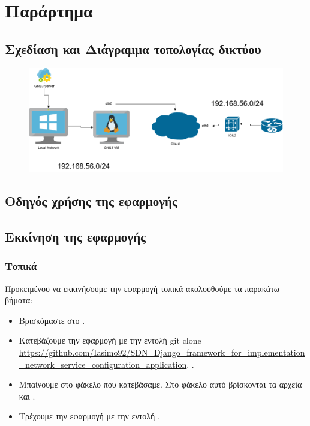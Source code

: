 \chapter{Παράρτημα}

\section{Σχεδίαση και Διάγραμμα τοπολογίας δικτύου}

\FloatBarrier

\begin{figure}[h]
	\centering
	\includegraphics[width=1.1\textwidth]{graphics/network_topology_high_level.png}
	\caption{}
\end{figure}

\FloatBarrier

\section{Οδηγός χρήσης της εφαρμογής}

\section{Εκκίνηση της εφαρμογής}

\subsection{Τοπικά}

Προκειμένου να εκκινήσουμε την εφαρμογή τοπικά ακολουθούμε τα παρακάτω βήματα:

\begin{itemize}
    \item Βρισκόμαστε στο .
    \item Κατεβάζουμε την εφαρμογή με την εντολή  git clone \url{https://github.com/Iasimo92/SDN_Django_framework_for_implementation_network_service_configuration_application}. .
    \item Μπαίνουμε στο φάκελο που κατεβάσαμε. Στο φάκελο αυτό βρίσκονται τα αρχεία  και .
    \item Τρέχουμε την εφαρμογή με την εντολή .

\end{itemize}

